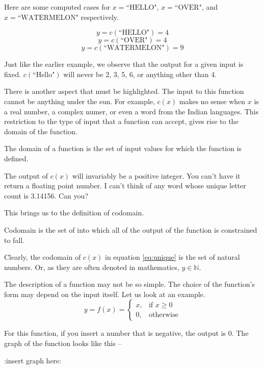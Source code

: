 Here are some computed cases for $x = \text{``HELLO"}$, $x = \text{``OVER"}$, and $x = \text{``WATERMELON"}$ respectively.

\[
y = c(\text{``HELLO"}) = 4
\]
\[
y = c(\text{``OVER"}) = 4
\]
\[
y = c(\text{``WATERMELON"}) = 9
\]

Just like the earlier example, we observe that the output for a given input is fixed. $c(\text{``Hello"})$ will never be 2, 3, 5, 6, or anything other than 4.

There is another aspect that must be highlighted. The input to this function cannot be anything under the sun. For example, $c(x)$ makes no sense when $x$ is a real number, a complex numer, or even a word from the Indian languages. This restriction to the type of input that a function can accept, gives rise to the domain of the function.

\begin{definition}
The domain of a function is the set of input values for which the function is defined.
\end{definition}

The output of $c(x)$ will invariably be a positive integer. You can't have it return a floating point number. I can't think of any word whose unique letter count is 3.14156. Can you?

This brings us to the definition of codomain.
\begin{definition}[Codomain]
Codomain is the set of into which all of the output of the function is constrained to fall.
\end{definition}

Clearly, the codomain of $c(x)$ in equation  \eqref{eq:unique} is the set of natural numbers. Or, as they are often denoted in mathematics, $y \in \mathbb{N}$.

The description of a function may not be so simple. The choice of the function's form may depend on the input itself. Let us look at an example.
\begin{equation}
    y = f(x)=
\begin{cases}
    x, & \text{if } x\geq 0\\
    0, & \text{otherwise}
\end{cases}
\end{equation}

For this function, if you insert a number that is negative, the output is 0. The graph of the function looks like this --

:insert graph here:

